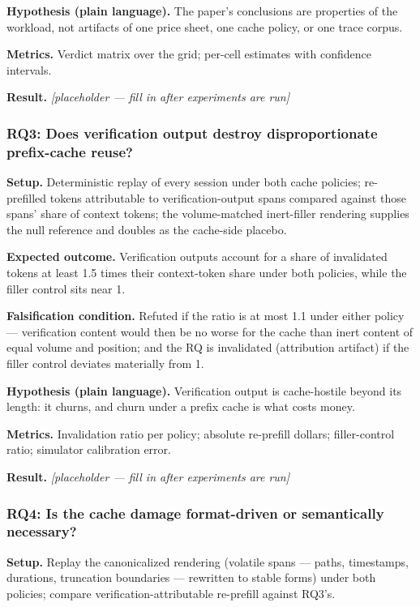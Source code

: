 \documentclass[11pt]{article}
\newcommand{\ph}{\textit{[placeholder --- fill in after experiments are run]}}
\begin{document}
\textbf{Hypothesis (plain language).} The paper's conclusions are properties of the workload, not artifacts of one price sheet, one cache policy, or one trace corpus.

\textbf{Metrics.} Verdict matrix over the grid; per-cell estimates with confidence intervals.

\textbf{Result.} \ph

\subsubsection{RQ3: Does verification output destroy disproportionate prefix-cache reuse?}

\textbf{Setup.} Deterministic replay of every session under both cache policies; re-prefilled tokens attributable to verification-output spans compared against those spans' share of context tokens; the volume-matched inert-filler rendering supplies the null reference and doubles as the cache-side placebo.

\textbf{Expected outcome.} Verification outputs account for a share of invalidated tokens at least 1.5 times their context-token share under both policies, while the filler control sits near 1.

\textbf{Falsification condition.} Refuted if the ratio is at most 1.1 under either policy --- verification content would then be no worse for the cache than inert content of equal volume and position; and the RQ is invalidated (attribution artifact) if the filler control deviates materially from 1.

\textbf{Hypothesis (plain language).} Verification output is cache-hostile beyond its length: it churns, and churn under a prefix cache is what costs money.

\textbf{Metrics.} Invalidation ratio per policy; absolute re-prefill dollars; filler-control ratio; simulator calibration error.

\textbf{Result.} \ph

\subsubsection{RQ4: Is the cache damage format-driven or semantically necessary?}

\textbf{Setup.} Replay the canonicalized rendering (volatile spans --- paths, timestamps, durations, truncation boundaries --- rewritten to stable forms) under both policies; compare verification-attributable re-prefill against RQ3's.
\end{document}
